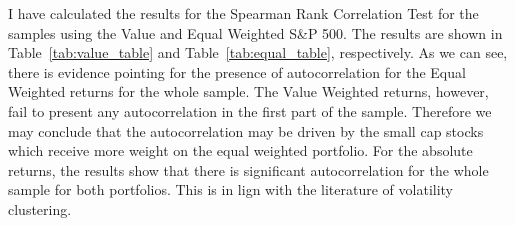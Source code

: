 \begin{solution}
    I have calculated the results for the Spearman Rank Correlation Test for the samples using the Value and Equal Weighted S\&P 500. The results are shown in Table~\ref{tab:value_table} and Table~\ref{tab:equal_table}, respectively. As we can see, there is evidence pointing for the presence of autocorrelation for the Equal Weighted returns for the whole sample. The Value Weighted returns, however, fail to present any autocorrelation in the first part of the sample. Therefore we may conclude that the autocorrelation may be driven by the small cap stocks which receive more weight on the equal weighted portfolio. For the absolute returns, the results show that there is significant autocorrelation for the whole sample for both portfolios. This is in lign with the literature of volatility clustering. \\
    
    
\end{solution}